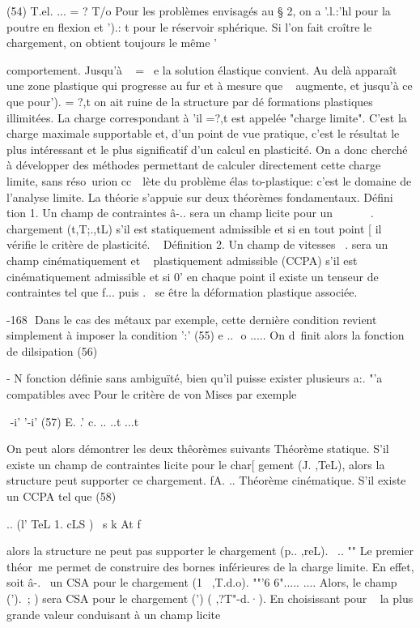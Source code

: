 (54)  T.el. ...  =  ? T/o  
Pour les problèmes envisagés  au  §  2,  on  a  '.l.:'hl  pour  la  poutre  en  flexion  
et ').: t  pour le réservoir sphérique.  
Si  l'on fait croître le chargement,  on  obtient  toujours  le même  
' 

comportement. Jusqu'à ~ = ~e la solution élastique convient. Au delà 
apparaît une zone plastique qui progresse au fur et à mesure que ~ aug­mente, et jusqu'à ce que pour'). = ?,t on ait ruine de la structure par dé­
formations plastiques illimitées. 
La charge correspondant à 'il =?,t est appelée "charge limite". C'est la charge maximale supportable et, d'un point de vue pratique, c'est le résultat le plus intéressant et le plus significatif d'un calcul en plas­ticité. On a donc cherché à développer des méthodes permettant de calculer 
directement cette charge limite, sans réso~urion cc~~lète du problème élas­
to-plastique: c'est le domaine de l'analyse limite. 
La théorie s'appuie sur deux théorèmes fondamentaux. 
Défini tion 1. Un champ de contraintes â-.. sera un champ licite pour un 
~~~~~~. ~~ 
chargement (t,T;.,tL) s'il est statiquement admissible et si en tout point 
[ 
il vérifie le critère de plasticité. 
~ 
Définition 2. Un champ de vitesses ~. sera un champ cinématiquement et 
~ 
plastiquement admissible (CCPA) s'il est cinématiquement admissible et si 
0' 
en  chaque point  il existe  un  tenseur  de  contraintes  tel que f... puis­ 
.~  
se  être la déformation plastique associée.  

-168 ­
Dans le cas des métaux par exemple, cette dernière condition re­vient simplement à imposer la condition 
':' 
(55) e ..  o 
..... 
On d~finit alors la fonction de dilsipation 
(56) 

-
N
fonction définie sans ambiguïté, bien qu'il puisse exister plusieurs a:. 
"'a
compatibles avec Pour le critère de von Mises par exemple 

 -i' '-i'
(57) 
E. .' c. .. 
..t ...t 

On peut alors démontrer les deux thêorèmes suivants 
Théorème statique. S'il existe un champ de contraintes licite pour le char­[ gement (J. ,TeL), alors la structure peut supporter ce chargement.
fA. .. 
Théorème cinématique. S'il existe un CCPA tel que 
(58) 

.. (l' TeL 1. cLS )
~s k At 
f 

alors la structure ne peut pas supporter le chargement (p.. ,reL). 
~.. "" 
Le premier théor~me permet de construire des bornes inférieures de la charge limite. En effet, soit â-.~ un CSA pour le chargement (1~ ,T.d.o).
""'6 6"..... .... 
Alors, le champ (').~; ) sera CSA pour le chargement (') ( ,?T"-d.·). En choisissant pour ~ la plus grande valeur conduisant à un champ licite 

